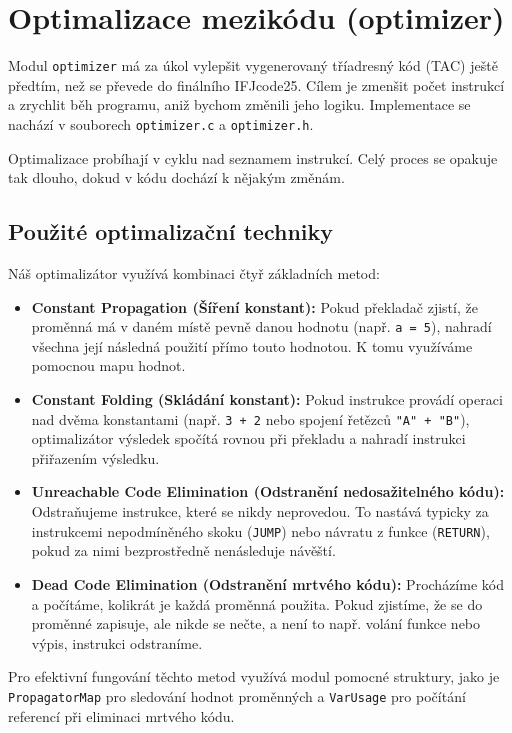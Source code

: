
\section{Optimalizace mezikódu (optimizer)}

Modul \texttt{optimizer} má za úkol vylepšit vygenerovaný tříadresný kód (TAC) ještě předtím, než se převede do finálního IFJcode25. Cílem je zmenšit počet instrukcí a zrychlit běh programu, aniž bychom změnili jeho logiku. Implementace se nachází v souborech \texttt{optimizer.c} a \texttt{optimizer.h}.

Optimalizace probíhají v cyklu nad seznamem instrukcí. Celý proces se opakuje tak dlouho, dokud v kódu dochází k nějakým změnám.

\subsection*{Použité optimalizační techniky}    

Náš optimalizátor využívá kombinaci čtyř základních metod:

\begin{itemize}
    \item \textbf{Constant Propagation (Šíření konstant):} Pokud překladač zjistí, že proměnná má v daném místě pevně danou hodnotu (např. \texttt{a = 5}), nahradí všechna její následná použití přímo touto hodnotou. K tomu využíváme pomocnou mapu hodnot.
    \item \textbf{Constant Folding (Skládání konstant):} Pokud instrukce provádí operaci nad dvěma konstantami (např. \texttt{3 + 2} nebo spojení řetězců \texttt{"A" + "B"}), optimalizátor výsledek spočítá rovnou při překladu a nahradí instrukci přiřazením výsledku.
    \item \textbf{Unreachable Code Elimination (Odstranění nedosažitelného kódu):} Odstraňujeme instrukce, které se nikdy neprovedou. To nastává typicky za instrukcemi nepodmíněného skoku (\texttt{JUMP}) nebo návratu z funkce (\texttt{RETURN}), pokud za nimi bezprostředně nenásleduje návěští.
    \item \textbf{Dead Code Elimination (Odstranění mrtvého kódu):} Procházíme kód a počítáme, kolikrát je každá proměnná použita. Pokud zjistíme, že se do proměnné zapisuje, ale nikde se nečte, a není to např. volání funkce nebo výpis, instrukci odstraníme.
\end{itemize}

Pro efektivní fungování těchto metod využívá modul pomocné struktury, jako je \texttt{PropagatorMap} pro sledování hodnot proměnných a \texttt{VarUsage} pro počítání referencí při eliminaci mrtvého kódu.